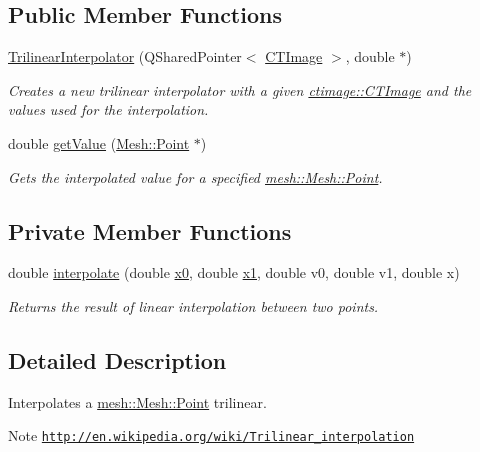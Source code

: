 \subsection*{Public Member Functions}
\begin{DoxyCompactItemize}
\item 
\hyperlink{classassignment_1_1_trilinear_interpolator_adbce93cb66d09622a5bde9fd51541783}{TrilinearInterpolator} (QSharedPointer$<$ \hyperlink{classctimage_1_1_c_t_image}{CTImage} $>$, double $\ast$)
\begin{DoxyCompactList}\small\item\em Creates a new trilinear interpolator with a given \hyperlink{classctimage_1_1_c_t_image}{ctimage::CTImage} and the values used for the interpolation. \item\end{DoxyCompactList}\item 
double \hyperlink{classassignment_1_1_trilinear_interpolator_a0972e2f1ebd828b832e94760c34b80c6}{getValue} (\hyperlink{structmesh_1_1_mesh_1_1_point}{Mesh::Point} $\ast$)
\begin{DoxyCompactList}\small\item\em Gets the interpolated value for a specified \hyperlink{structmesh_1_1_mesh_1_1_point}{mesh::Mesh::Point}. \item\end{DoxyCompactList}\end{DoxyCompactItemize}
\subsection*{Private Member Functions}
\begin{DoxyCompactItemize}
\item 
double \hyperlink{classassignment_1_1_trilinear_interpolator_a1b3999fc976f482b1ea41159a1170cd7}{interpolate} (double \hyperlink{classassignment_1_1_interpolator3_d_afb656ddf8789b483a8570f7a93985c0c}{x0}, double \hyperlink{classassignment_1_1_interpolator3_d_ab8f3111100189b5730621f77fe54467e}{x1}, double v0, double v1, double x)
\begin{DoxyCompactList}\small\item\em Returns the result of linear interpolation between two points. \item\end{DoxyCompactList}\end{DoxyCompactItemize}


\subsection{Detailed Description}
Interpolates a \hyperlink{structmesh_1_1_mesh_1_1_point}{mesh::Mesh::Point} trilinear. \begin{DoxyNote}{Note}
\href{http://en.wikipedia.org/wiki/Trilinear_interpolation}{\tt http://en.wikipedia.org/wiki/Trilinear\_\-interpolation} 
\end{DoxyNote}



